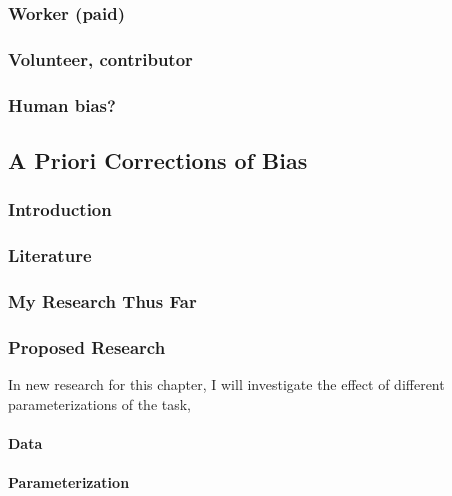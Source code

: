 \subsubsection{Worker (paid)}\label{worker-paid}

\subsubsection{Volunteer, contributor}\label{volunteer-contributor}

\subsubsection{Human bias?}\label{human-bias}

\subsection{A Priori Corrections of
Bias}\label{a-priori-corrections-of-bias}

\subsubsection{Introduction}\label{introduction-2}

\subsubsection{Literature}\label{literature}

\subsubsection{My Research Thus Far}\label{my-research-thus-far}

\subsubsection{Proposed Research}\label{proposed-research}

In new research for this chapter, I will investigate the effect of
different parameterizations of the task,

\paragraph{Data}\label{data}

\paragraph{Parameterization}\label{parameterization}

